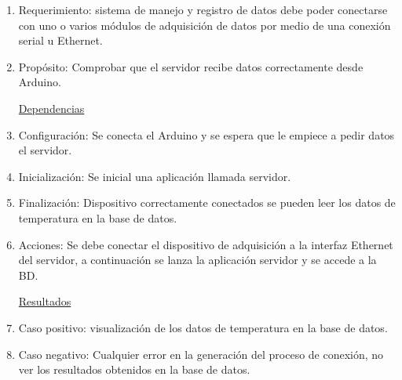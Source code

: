 \begin{enumerate}
\item Requerimiento: sistema de manejo y registro de datos debe poder conectarse con uno o varios módulos de adquisición de datos por medio de una conexión serial u Ethernet.
\item Propósito: Comprobar que el servidor recibe datos correctamente desde Arduino.
 
\underline{\textcolor[gray]{.8}{Dependencias}}

\item Configuración: Se conecta el Arduino y se espera que le empiece a pedir datos el servidor.
\item Inicialización: Se inicial una aplicación llamada servidor.
\item Finalización: Dispositivo correctamente conectados se pueden leer los datos de temperatura en la base de datos.   
\item Acciones: Se debe conectar el dispositivo de adquisición a la interfaz Ethernet del servidor, a continuación se lanza la aplicación servidor y se accede a la BD.

\underline{\textcolor[gray]{.8}{Resultados}} 

\item Caso positivo: visualización de los datos de temperatura en la base de datos.
\item Caso negativo: Cualquier error en la generación del proceso de conexión, no ver los resultados obtenidos en la base de datos.

\end{enumerate}

